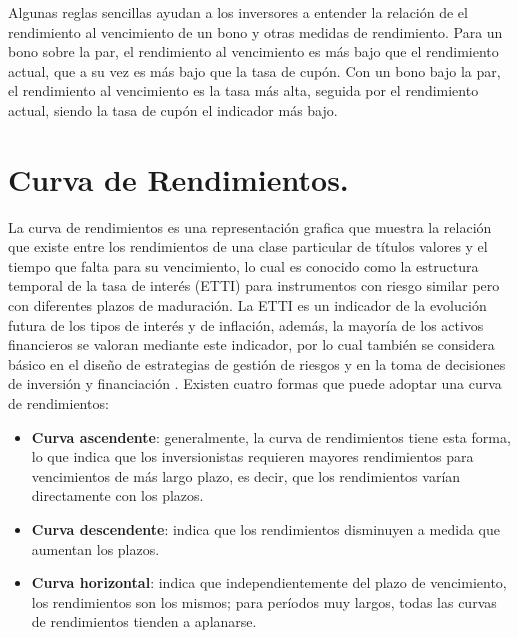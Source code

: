 \hspace*{0.4 cm} Algunas reglas sencillas ayudan a los inversores a entender la relaci\'on de el rendimiento al vencimiento de un bono y otras medidas de rendimiento. Para un bono sobre la par, el rendimiento al vencimiento es m\'as bajo que el rendimiento actual, que a su vez es m\'as bajo que la tasa de cup\'on. Con un bono bajo la par, el rendimiento al vencimiento es la tasa m\'as alta, seguida por el rendimiento actual, siendo la tasa de cup\'on el indicador m\'as bajo.


\section{Curva de Rendimientos.}

\hspace*{0.4 cm} La curva de rendimientos es una representaci\'on grafica que muestra la relaci\'on que existe entre los rendimientos de una clase particular de t\'itulos valores y el tiempo que falta para su vencimiento, lo cual es conocido como la estructura temporal de la tasa de inter\'es (ETTI) para instrumentos con riesgo similar pero con diferentes plazos de maduraci\'on. La ETTI es un indicador de la evoluci\'on futura de los tipos de inter\'es y de inflaci\'on, adem\'as, la mayor\'ia de los activos financieros se valoran mediante este indicador, por lo cual tambi\'en se considera b\'asico en el dise\~no de estrategias de gesti\'on de riesgos y en la toma de decisiones de inversi\'on y financiaci\'on \cite{FR}. Existen cuatro formas que puede adoptar una curva de rendimientos:

\begin{itemize}
  \item \textbf{Curva ascendente}: generalmente, la curva de rendimientos tiene esta      forma, lo que indica que los inversionistas requieren mayores rendimientos     para vencimientos de m\'as largo plazo, es decir, que los rendimientos         var\'ian directamente con los plazos. 
  \item \textbf{Curva descendente}: indica que los rendimientos disminuyen a medida que   aumentan los plazos.
\end{itemize}

\begin{itemize}
   \item \textbf{Curva horizontal}: indica que independientemente del plazo de vencimiento, los rendimientos son los mismos; para per\'iodos muy largos, todas las      curvas de rendimientos tienden a aplanarse.
\end{itemize}


